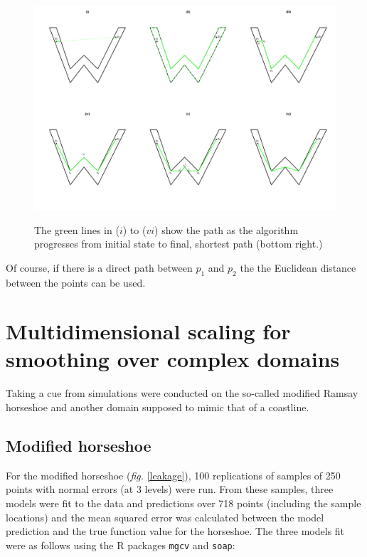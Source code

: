 \documentclass[a4paper,10pt]{article}
\newcommand{\fig}[1]{\emph{fig.} \ref{#1}}
\begin{document}
\begin{figure}
\centering
\includegraphics[trim=0in 0.5in 0in 0.25in, width=7in]{figs/wdia.pdf} \\
\caption{The green lines in ($i$) to ($vi$) show the path as the algorithm progresses from initial state to final, shortest path (bottom right.) }
\label{wdia}
\end{figure}

Of course, if there is a direct path between $p_1$ and $p_2$ the the Euclidean distance between the points can be used.

\section{Multidimensional scaling for smoothing over complex domains}

Taking a cue from \cite{soap} simulations were conducted on the so-called modified Ramsay horseshoe and another domain supposed to mimic that of a coastline.

\subsection{Modified horseshoe}

For the modified horseshoe (\fig{leakage}), 100 replications of samples of 250 points with normal errors (at 3 levels) were run. From these samples, three models were fit to the data and predictions over 718 points (including the sample locations) and the mean squared error was calculated between the model prediction and the true function value for the horseshoe. The three models fit were as follows using the \textsf{R} packages \texttt{mgcv} and \texttt{soap}:
\end{document}
